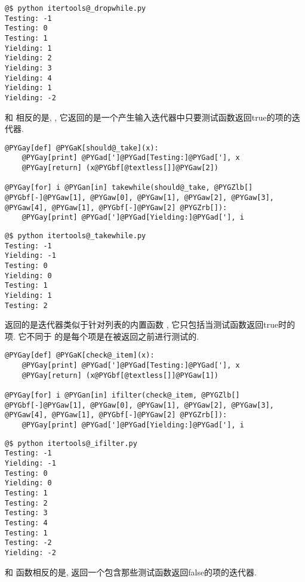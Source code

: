 \documentclass[a4paper,10pt,english]{manual}
\begin{document}
\begin{Verbatim}[commandchars=@\[\]]
@$ python itertools@_dropwhile.py
Testing: -1
Testing: 0
Testing: 1
Yielding: 1
Yielding: 2
Yielding: 3
Yielding: 4
Yielding: 1
Yielding: -2
\end{Verbatim}

和  相反的是,  , 它返回的是一个产生输入迭代器中只要测试函数返回true的项的迭代器.

\begin{Verbatim}[commandchars=@\[\]]
@PYGay[def] @PYGaK[should@_take](x):
    @PYGay[print] @PYGad[']@PYGad[Testing:]@PYGad['], x
    @PYGay[return] (x@PYGbf[@textless[]]@PYGaw[2])

@PYGay[for] i @PYGan[in] takewhile(should@_take, @PYGZlb[] @PYGbf[-]@PYGaw[1], @PYGaw[0], @PYGaw[1], @PYGaw[2], @PYGaw[3], @PYGaw[4], @PYGaw[1], @PYGbf[-]@PYGaw[2] @PYGZrb[]):
    @PYGay[print] @PYGad[']@PYGad[Yielding:]@PYGad['], i
\end{Verbatim}

\begin{Verbatim}[commandchars=@\[\]]
@$ python itertools@_takewhile.py
Testing: -1
Yielding: -1
Testing: 0
Yielding: 0
Testing: 1
Yielding: 1
Testing: 2
\end{Verbatim}

 返回的是迭代器类似于针对列表的内置函数  , 它只包括当测试函数返回true时的项. 它不同于  的是每个项是在被返回之前进行测试的.

\begin{Verbatim}[commandchars=@\[\]]
@PYGay[def] @PYGaK[check@_item](x):
    @PYGay[print] @PYGad[']@PYGad[Testing:]@PYGad['], x
    @PYGay[return] (x@PYGbf[@textless[]]@PYGaw[1])

@PYGay[for] i @PYGan[in] ifilter(check@_item, @PYGZlb[] @PYGbf[-]@PYGaw[1], @PYGaw[0], @PYGaw[1], @PYGaw[2], @PYGaw[3], @PYGaw[4], @PYGaw[1], @PYGbf[-]@PYGaw[2] @PYGZrb[]):
    @PYGay[print] @PYGad[']@PYGad[Yielding:]@PYGad['], i
\end{Verbatim}

\begin{Verbatim}[commandchars=@\[\]]
@$ python itertools@_ifilter.py
Testing: -1
Yielding: -1
Testing: 0
Yielding: 0
Testing: 1
Testing: 2
Testing: 3
Testing: 4
Testing: 1
Testing: -2
Yielding: -2
\end{Verbatim}

和  函数相反的是,  返回一个包含那些测试函数返回false的项的迭代器.
\end{document}
